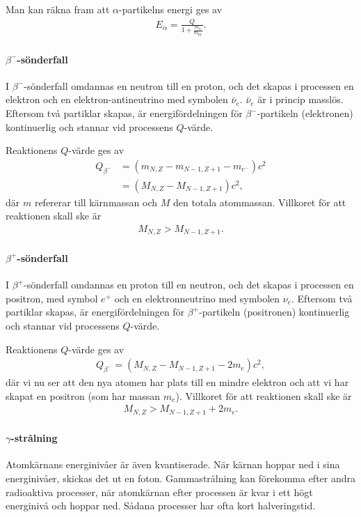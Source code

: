 Man kan räkna fram att $\alpha$-partikelns energi ges av
\begin{align*}
	E_{\alpha} = \frac{Q}{1 + \frac{m_{\alpha}}{m_{\text{ny}}}}.
\end{align*}

\paragraph{$\beta^{-}$-sönderfall}
I $\beta^{-}$-sönderfall omdannas en neutron till en proton, och det skapas i processen en elektron och en elektron-antineutrino med symbolen $\bar{\nu}_{e}$. $\bar{\nu}_{e}$ är i princip masslös. Eftersom två partiklar skapas, är energifördelningen för $\beta^{-}$-partikeln (elektronen) kontinuerlig och stannar vid processens $Q$-värde.

Reaktionens $Q$-värde ges av
\begin{align*}
	Q_{\beta^{-}} &= (m_{N, Z} - m_{N - 1, Z + 1} - m_{e^{-}})c^{2} \\
	              &= (M_{N, Z} - M_{N - 1, Z + 1})c^{2},
\end{align*}
där $m$ refererar till kärnmassan och $M$ den totala atommassan. Villkoret för att reaktionen skall ske är
\begin{align*}
	M_{N, Z} > M_{N - 1, Z + 1}.
\end{align*}

\paragraph{$\beta^{+}$-sönderfall}
I $\beta^{+}$-sönderfall omdannas en proton till en neutron, och det skapas i processen en positron, med symbol $e^{+}$ och en elektronneutrino med symbolen $\nu_{e}$. Eftersom två partiklar skapas, är energifördelningen för $\beta^{+}$-partikeln (positronen) kontinuerlig och stannar vid processens $Q$-värde.

Reaktionens $Q$-värde ges av
\begin{align*}
	Q_{\beta^{-}} = (M_{N, Z} - M_{N - 1, Z + 1} - 2m_{e})c^{2},
\end{align*}
där vi nu ser att den nya atomen har plats till en mindre elektron och att vi har skapat en positron (som har massan $m_{e}$). Villkoret för att reaktionen skall ske är
\begin{align*}
	M_{N, Z} > M_{N - 1, Z + 1} + 2m_{e}.
\end{align*}

\paragraph{$\gamma$-strålning}
Atomkärnans energinivåer är även kvantiserade. När kärnan hoppar ned i sina energinivåer, skickas det ut en foton. Gammastrålning kan förekomma efter andra radioaktiva processer, när atomkärnan efter processen är kvar i ett högt energinivå och hoppar ned. Sådana processer har ofta kort halveringstid.

